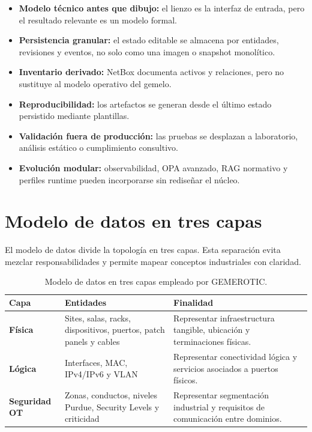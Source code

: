\begin{itemize}
    \item \textbf{Modelo técnico antes que dibujo:} el lienzo es la interfaz de entrada, pero el resultado relevante es un modelo formal.
    \item \textbf{Persistencia granular:} el estado editable se almacena por entidades, revisiones y eventos, no solo como una imagen o snapshot monolítico.
    \item \textbf{Inventario derivado:} NetBox documenta activos y relaciones, pero no sustituye al modelo operativo del gemelo.
    \item \textbf{Reproducibilidad:} los artefactos se generan desde el último estado persistido mediante plantillas.
    \item \textbf{Validación fuera de producción:} las pruebas se desplazan a laboratorio, análisis estático o cumplimiento consultivo.
    \item \textbf{Evolución modular:} observabilidad, OPA avanzado, RAG normativo y perfiles runtime pueden incorporarse sin rediseñar el núcleo.
\end{itemize}

\section{Modelo de datos en tres capas} \label{sec:modelo-tres-capas}

El modelo de datos divide la topología en tres capas. Esta separación evita mezclar responsabilidades y permite mapear conceptos industriales con claridad.

\begin{table}[H]
    \centering
    \small
    \renewcommand{\arraystretch}{1.4}
    \begin{tabularx}{\textwidth}{>{\bfseries}p{2.5cm}p{4.0cm}X}
        \toprule
        Capa & Entidades & Finalidad \\
        \midrule
        Física & Sites, salas, racks, dispositivos, puertos, patch panels y cables & Representar infraestructura tangible, ubicación y terminaciones físicas. \\
        Lógica & Interfaces, MAC, IPv4/IPv6 y VLAN & Representar conectividad lógica y servicios asociados a puertos físicos. \\
        Seguridad OT & Zonas, conductos, niveles Purdue, Security Levels y criticidad & Representar segmentación industrial y requisitos de comunicación entre dominios. \\
        \bottomrule
    \end{tabularx}
    \caption{Modelo de datos en tres capas empleado por GEMEROTIC.}
    \label{tab:modelo-tres-capas}
\end{table}

